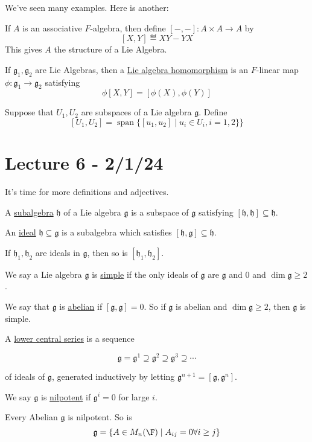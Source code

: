 \documentclass[x11names,reqno,14pt]{extarticle}
\newcommand{\mk}[1]{\mathfrak{#1}}
\newcommand{\g}{\mk{g}}
\newcommand{\h}{\mk{h}}
\begin{document}
We've seen many examples. Here is another:


If $A$ is an associative $F$-algebra, then define $[-,-]:A\times A \to A$ by 
\[
[X,Y] \eqdef XY - YX
\]
This gives $A$ the structure of a Lie Algebra. 


If $\g_1, \g_2$ are Lie Algebras, then a \underline{Lie algebra homomorphism} is an $F$-linear map $\phi:\g_1\to\g_2$ satisfying 
\[
\phi[X,Y] = [\phi(X),\phi(Y)]
\]


Suppose that $U_1, U_2$ are subspaces of a Lie algebra $\g$. Define
\[
[U_1,U_2] = \operatorname{span}\{[u_1, u_2] \mid u_i \in U_i, i = 1, 2\} \}
\]

\section*{Lecture 6 - 2/1/24}

It's time for more definitions and adjectives. 


A \underline{subalgebra} $\h$ of a Lie algebra $\g$ is a subspace of $\g$ satisfying $[\h,\h]\subseteq\h$. 


An \underline{ideal} $\h\subseteq\g$ is a subalgebra which satisfies $[\h,\g]\subseteq\h$. 

If $\h_1,\h_2$ are ideals in $\g$, then so is $[\h_1,\h_2]$. 


We say a Lie algebra $\g$ is \underline{simple} if the only ideals of $\g$ are $\g$ and 0 and $\dim\g \geq2$. 


We say that $\g$ is \underline{abelian} if $[\g,\g]=0$. So if $\g$ is abelian and $\dim \g\geq2$, then $\g$ is simple. 


A \underline{lower central series} is a sequence

\[
\g = \g^1 \supseteq \g^2 \supseteq \g^3 \supseteq \cdots
\]

of ideals of $\g$, generated inductively by letting $\g^{n + 1} = [\g,\g^n]$. 


We say $\g$ is \underline{nilpotent} if $\g^i = 0$ for large $i$. 

Every Abelian $\g$ is nilpotent. So is 
\[
\g = \{A \in M_n(\F) \mid A_{ij} = 0 \forall i \geq j\}
\]
\end{document}

